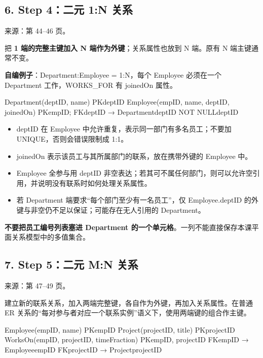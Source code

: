 \subsection{6. Step 4：二元 1:N 关系}\label{04_er_to_relational_mapping_zh-step-4ux4e8cux5143-1n-ux5173ux7cfb}

来源：第 44--46 页。

把 \textbf{1 端的完整主键加入 N 端作为外键}；关系属性也放到 N 端。原有 N 端主键通常不变。

\textbf{自编例子}：Department:Employee = 1:N，每个 Employee 必须在一个 Department 工作，WORKS\_FOR 有 joinedOn 属性。

\begin{StudyCode}
Department(deptID, name)                   PK{deptID}
Employee(empID, name, deptID, joinedOn)
  PK{empID}; FK{deptID} → Department{deptID}
  NOT NULL{deptID}
\end{StudyCode}

\begin{itemize}
\tightlist
\item
  deptID 在 Employee 中允许重复，表示同一部门有多名员工；不要加 UNIQUE，否则会错误限制成 1:1。
\item
  joinedOn 表示该员工与其所属部门的联系，放在携带外键的 Employee 中。
\item
  Employee 全参与用 deptID 非空表达；若其可不属任何部门，则可以允许空引用，并说明没有联系时如何处理关系属性。
\item
  若 Department 端要求``每个部门至少有一名员工''，仅 Employee.deptID 的外键与非空仍不足以保证；可能存在无人引用的 Department。
\end{itemize}

\textbf{不要把员工编号列表塞进 Department 的一个单元格}。一列不能直接保存本课平面关系模型中的多值集合。

\subsection{7. Step 5：二元 M:N 关系}\label{04_er_to_relational_mapping_zh-step-5ux4e8cux5143-mn-ux5173ux7cfb}

来源：第 47--49 页。

建立新的联系关系，加入两端完整键，各自作为外键，再加入关系属性。在普通 ER 关系的``每对参与者对应一个联系实例''语义下，使用两端键的组合作主键。

\begin{StudyCode}
Employee(empID, name)                     PK{empID}
Project(projectID, title)                 PK{projectID}
WorksOn(empID, projectID, timeFraction)
  PK{empID, projectID}
  FK{empID} → Employee{empID}
  FK{projectID} → Project{projectID}
\end{StudyCode}

